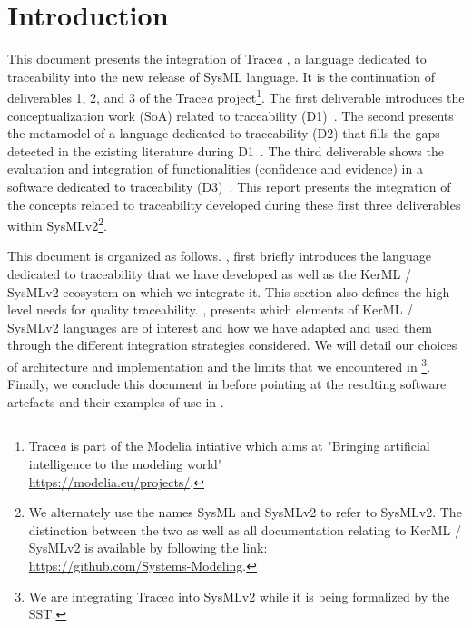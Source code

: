 
%	



\section{Introduction}\label{sect:intro}
This document presents the integration of Trace\textit{a} \cite{batot2021-not-another-metamodel}, a language dedicated to traceability into the new release of SysML language.
It is the continuation of deliverables 1, 2, and 3 of the Trace\textit{a} project\footnote{Trace\textit{a} is part of the Modelia intiative which aims at "Bringing artificial intelligence to the modeling world"\\ \url{https://modelia.eu/projects/}.}. The first deliverable introduces the conceptualization work (SoA) related to traceability (D1)~\cite{deliverable1}. The second presents the metamodel of a language dedicated to traceability (D2) that fills the gaps detected in the existing literature during D1~\cite{deliverable2}. The third deliverable shows the evaluation and integration of functionalities (confidence and evidence) in a software dedicated to traceability (D3)~\cite{deliverable3}.
This report presents the integration of the concepts related to traceability developed during these first three deliverables within SysMLv2\footnote{We alternately use the names SysML and SysMLv2 to refer to SysMLv2. The distinction between the two as well as all documentation relating to KerML / SysMLv2 is available by following the link:\\ \url{https://github.com/Systems-Modeling}.}.

This document is organized as follows.
, first briefly introduces the language dedicated to traceability that we have developed as well as the KerML / SysMLv2 ecosystem on which we integrate it. This section also defines the high level needs for quality traceability.
, presents which elements of KerML / SysMLv2 languages are of interest and how we have adapted and used them through the different integration strategies considered.
We will detail our choices of architecture and implementation and the limits that we encountered in \footnote{We are integrating Trace\textit{a} into SysMLv2 while it is being formalized by the SST.}.
Finally, we conclude this document in  before pointing at the resulting software artefacts and their examples of use in .






